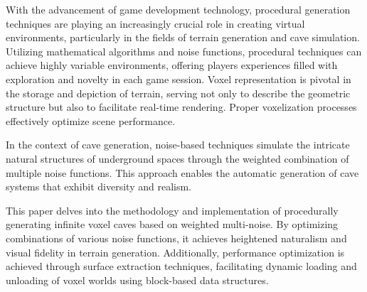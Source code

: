 With the advancement of game development technology, 
procedural generation techniques are playing an increasingly crucial role in creating virtual environments, 
particularly in the fields of terrain generation and cave simulation. 
Utilizing mathematical algorithms and noise functions, 
procedural techniques can achieve highly variable environments, 
offering players experiences filled with exploration and novelty in each game session. 
Voxel representation is pivotal in the storage and depiction of terrain, 
serving not only to describe the geometric structure but also to facilitate real-time rendering. 
Proper voxelization processes effectively optimize scene performance.

In the context of cave generation, 
noise-based techniques simulate the intricate natural structures of underground spaces through the weighted combination of multiple noise functions. 
This approach enables the automatic generation of cave systems that exhibit diversity and realism.

This paper delves into the methodology and implementation of procedurally generating infinite voxel caves based on weighted multi-noise. 
By optimizing combinations of various noise functions, 
it achieves heightened naturalism and visual fidelity in terrain generation. 
Additionally, performance optimization is achieved through surface extraction techniques, 
facilitating dynamic loading and unloading of voxel worlds using block-based data structures.